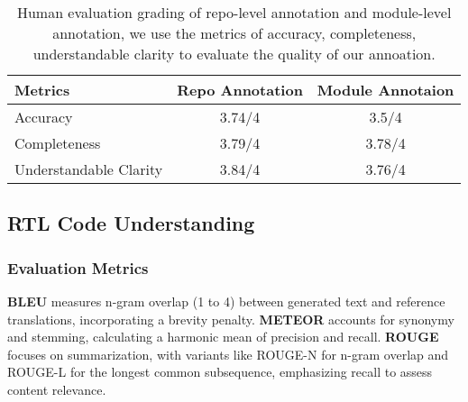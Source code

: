 \begin{table}[ht]
\centering
\caption{Human evaluation grading of repo-level annotation and module-level annotation, we use the metrics of accuracy, completeness, understandable clarity to evaluate the quality of our annoation.}
\vspace{1em}
\begin{tabular}{lcc}
\toprule
\textbf{Metrics} & \textbf{Repo Annotation} & \textbf{Module Annotaion} \\ 
\midrule
Accuracy &3.74/4		&3.5/4	\\
Completeness &3.79/4   &3.78/4\\
Understandable Clarity &3.84/4   &3.76/4\\
\bottomrule
\end{tabular}

\label{tab:human_eval}
\end{table}







\subsection{RTL Code Understanding}
\label{sec:understanding}





\subsubsection{Evaluation Metrics}

\textbf{BLEU} measures n-gram overlap (1 to 4) between generated text and reference translations, incorporating a brevity penalty.
\textbf{METEOR} accounts for synonymy and stemming, calculating a harmonic mean of precision and recall. 
\textbf{ROUGE} focuses on summarization, with variants like ROUGE-N for n-gram overlap and ROUGE-L for the longest common subsequence, emphasizing recall to assess content relevance.






